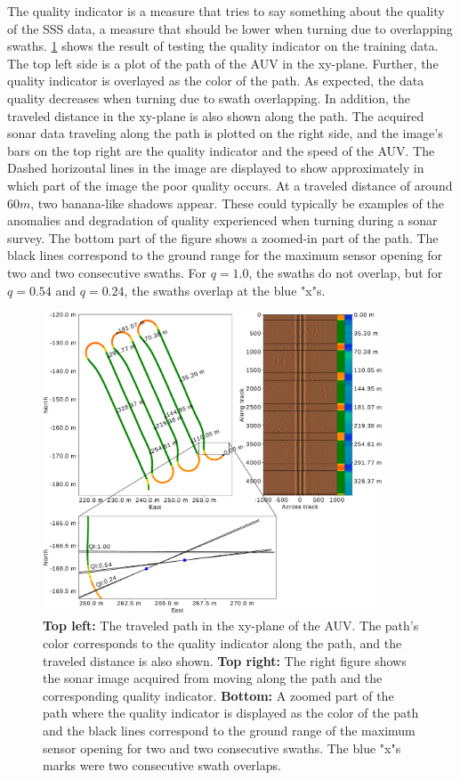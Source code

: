The quality indicator is a measure that tries to say something about the quality of the SSS data, a measure that should be lower when turning due to overlapping swaths. \cref{fig:path_and_quality_ind} shows the result of testing the quality indicator on the training data. The top left side is a plot of the path of the AUV in the xy-plane. Further, the quality indicator is overlayed as the color of the path. As expected, the data quality decreases when turning due to swath overlapping. In addition, the traveled distance in the xy-plane is also shown along the path. The acquired sonar data traveling along the path is plotted on the right side, and the image's bars on the top right are the quality indicator and the speed of the AUV. The Dashed horizontal lines in the image are displayed to show approximately in which part of the image the poor quality occurs. At a traveled distance of around $60 m$, two banana-like shadows appear. These could typically be examples of the anomalies and degradation of quality experienced when turning during a sonar survey. The bottom part of the figure shows a zoomed-in part of the path. The black lines correspond to the ground range for the maximum sensor opening for two and two consecutive swaths. For $q = 1.0$, the swaths do not overlap, but for $q = 0.54$ and $q=0.24$, the swaths overlap at the blue "x"s. 

\begin{figure} %
  \centering
  \includegraphics[trim=0cm 0cm 0cm 0cm, clip=true, width=0.9\textwidth]{figures/quality_indicator_and_path.pdf}
  \caption[Path with quality indicator overlayed]{\textbf{Top left:} The traveled path in the xy-plane of the AUV. The path's color corresponds to the quality indicator along the path, and the traveled distance is also shown. \textbf{Top right:} The right figure shows the sonar image acquired from moving along the path and the corresponding quality indicator. \textbf{Bottom:} A zoomed part of the path where the quality indicator is displayed as the color of the path and the black lines correspond to the ground range of the maximum sensor opening for two and two consecutive swaths. The blue "x"s marks were two consecutive swath overlaps.}
  \label{fig:path_and_quality_ind}
\end{figure}

